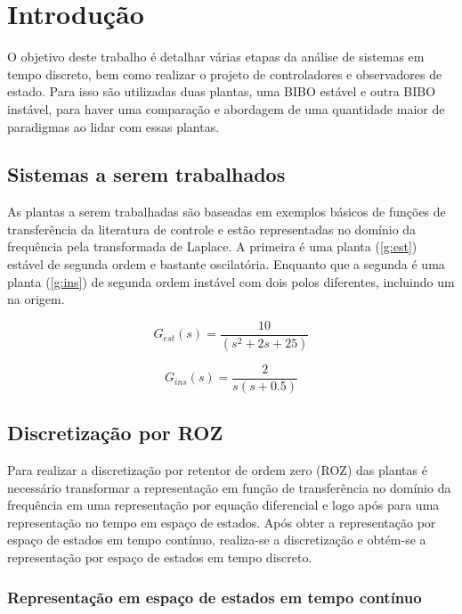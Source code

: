 \section{Introdução}

O objetivo deste trabalho é detalhar várias etapas da análise de sistemas em tempo discreto, bem como realizar o projeto de controladores e observadores de estado. Para isso são utilizadas duas plantas, uma BIBO estável e outra BIBO instável, para haver uma comparação e abordagem de uma quantidade maior de paradigmas ao lidar com essas plantas.

\subsection{Sistemas a serem trabalhados}

As plantas a serem trabalhadas são baseadas em exemplos básicos de funções de transferência da literatura de controle e estão representadas no domínio da frequência pela transformada de Laplace. A primeira é uma planta (\ref{g:est}) estável de segunda ordem e bastante oscilatória. Enquanto que a segunda é uma planta (\ref{g:ins}) de segunda ordem instável com dois polos diferentes, incluindo um na origem. 

\begin{equation} \label{g:est}
    G_{est}(s) = \frac{10}{(s^2+2s+25)}
\end{equation}

\begin{equation} \label{g:ins}
    G_{ins}(s) = \frac{2}{s(s+0.5)}
\end{equation}


\subsection{Discretização por ROZ}

Para realizar a discretização por retentor de ordem zero (ROZ) das plantas é necessário transformar a representação em função de transferência no domínio da frequência em uma representação por equação diferencial e logo após para uma representação no tempo em espaço de estados. Após obter a representação por espaço de estados em tempo contínuo, realiza-se a discretização e obtém-se a representação por espaço de estados em tempo discreto. 

\subsubsection{Representação em espaço de estados em tempo contínuo}

